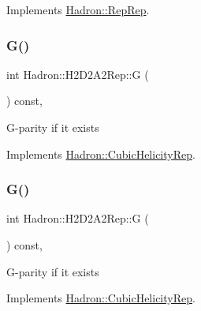 Implements \mbox{\hyperlink{structHadron_1_1RepRep_a92c8802e5ed7afd7da43ccfd5b7cd92b}{Hadron\+::\+Rep\+Rep}}.

\mbox{\label{structHadron_1_1H2D2A2Rep_ac1b2b45b37d739d8310f21abba40eb84}} 
\subsubsection{\texorpdfstring{G()}{G()}\hspace{0.1cm}{\footnotesize\ttfamily [1/3]}}
{\footnotesize\ttfamily int Hadron\+::\+H2\+D2\+A2\+Rep\+::G (\begin{DoxyParamCaption}{ }\end{DoxyParamCaption}) const\hspace{0.3cm}{\ttfamily [inline]}, {\ttfamily [virtual]}}

G-\/parity if it exists 

Implements \mbox{\hyperlink{structHadron_1_1CubicHelicityRep_a50689f42be1e6170aa8cf6ad0597018b}{Hadron\+::\+Cubic\+Helicity\+Rep}}.

\mbox{\label{structHadron_1_1H2D2A2Rep_ac1b2b45b37d739d8310f21abba40eb84}} 
\subsubsection{\texorpdfstring{G()}{G()}\hspace{0.1cm}{\footnotesize\ttfamily [2/3]}}
{\footnotesize\ttfamily int Hadron\+::\+H2\+D2\+A2\+Rep\+::G (\begin{DoxyParamCaption}{ }\end{DoxyParamCaption}) const\hspace{0.3cm}{\ttfamily [inline]}, {\ttfamily [virtual]}}

G-\/parity if it exists 

Implements \mbox{\hyperlink{structHadron_1_1CubicHelicityRep_a50689f42be1e6170aa8cf6ad0597018b}{Hadron\+::\+Cubic\+Helicity\+Rep}}.

\mbox{\label{structHadron_1_1H2D2A2Rep_ac1b2b45b37d739d8310f21abba40eb84}} 
